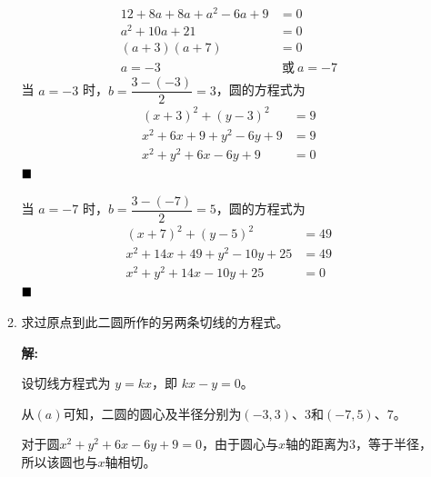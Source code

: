 \documentclass[10pt]{article}
\newcommand{\sol}{\textbf{解:} }
\begin{document}
\begin{enumerate}[leftmargin=*]
\begin{enumerate}
\begin{align*}
                  12 + 8a + 8a + a^{2} - 6a + 9                                                                                                      & = 0                                        \\
                  a^{2} + 10a + 21                                                                                                                   & = 0                                        \\
                  (a + 3)(a + 7)                                                                                                                     & = 0                                        \\
                  a = -3                                                                                                                             & \ \text{或}\ a = -7
                \end{align*}
                当 $a = -3$ 时，$b = \dfrac{3 - (-3)}{2} = 3$，圆的方程式为
                \begin{align*}
                  (x + 3)^{2} + (y - 3)^{2}       & = 9 \\
                  x^{2} + 6x + 9 + y^{2} - 6y + 9 & = 9 \\
                  x^{2} + y^{2} + 6x - 6y + 9     & = 0
                \end{align*} $\hfill\blacksquare$

                当 $a = -7$ 时，$b = \dfrac{3 - (-7)}{2} = 5$，圆的方程式为
                \begin{align*}
                  (x + 7)^{2} + (y - 5)^{2}           & = 49 \\
                  x^{2} + 14x + 49 + y^{2} - 10y + 25 & = 49 \\
                  x^{2} + y^{2} + 14x - 10y + 25      & = 0
                \end{align*} $\hfill\blacksquare$

          \item 求过原点到此二圆所作的另两条切线的方程式。

                \sol{}

                设切线方程式为 $y = kx$，即 $kx - y = 0$。

                从$(a)$可知，二圆的圆心及半径分别为$(-3, 3)$、$3$和$(-7, 5)$、$7$。

                对于圆$x^{2} + y^{2} + 6x - 6y + 9 = 0$，由于圆心与$x$轴的距离为$3$，等于半径，所以该圆也与$x$轴相切。


\end{enumerate}
\end{enumerate}
\end{document}
